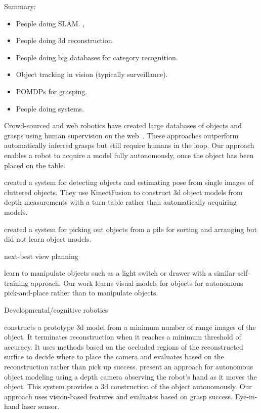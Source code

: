 \documentclass[conference]{IEEEtran}
\begin{document}
Summary: 
\begin{itemize}
\item People doing SLAM.  \citet{wang07, gallagher09}, 
\item People doing 3d reconstruction.   \citet{krainin11, banta00}
\item People doing big databases for category recognition.  \citet{kent14a, kent14, lai11a, goldfeder09}
\item Object tracking in vision (typically surveillance).
\item POMDPs for grasping.  \citet{platt11, hsiao10}
\item People doing systems.  \citet{hudson12, ciocarlie14}
\end{itemize}




Crowd-sourced and web robotics have created large databases of objects
and grasps using human supervision on the web~\citep{kent14a, kent14}.
These approaches outperform automatically inferred grasps but still
require humans in the loop.  Our approach enables a robot to acquire a
model fully autonomously, once the object has been placed on the
table.

\citet{zhu14} created a system for detecting objects and estimating
pose from single images of cluttered objects.  They use KinectFusion
to construct 3d object models from depth measurements with a
turn-table rather than automatically acquiring models.

\citet{chang12} created a system for picking out objects from a pile
for sorting and arranging but did not learn object models.  

next-best view planning~\citep{kriegel11}

\citet{nguyen14} learn to manipulate objects such as a light switch or
drawer with a similar self-training approach.  Our work learns visual
models for objects for autonomous pick-and-place rather than to
manipulate objects.

Developmental/cognitive robotics~\citep{lyubova13, kraft10r}

\citet{banta00} constructs a prototype 3d model from a minimum number
of range images of the object.  It terminates reconstruction when it
reaches a minimum threshold of accuracy.  It uses methods based on the
occluded regions of the reconstructed surfice to decide where to place
the camera and evaluates based on the reconstruction rather than pick
up success.  \citet{krainin11} present an approach for autonomous
object modeling using a depth camera observing the robot's hand as it
moves the object.  This system provides a 3d construction of the
object autonomously.  Our approach uses vision-based features and
evaluates based on grasp success.  Eye-in-hand laser
sensor.~\citep{aeotti14}
\end{document}
